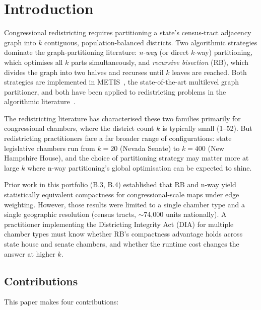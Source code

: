 \section{Introduction}
\label{sec:intro}

Congressional redistricting requires partitioning a state's census-tract
adjacency graph into $k$ contiguous, population-balanced districts.
Two algorithmic strategies dominate the graph-partitioning literature:
\emph{n-way} (or direct $k$-way) partitioning, which optimises all $k$ parts
simultaneously, and \emph{recursive bisection} (RB), which divides the graph
into two halves and recurses until $k$ leaves are reached.
Both strategies are implemented in METIS~\citep{karypis1998}, the
state-of-the-art multilevel graph partitioner, and both have been applied to
redistricting problems in the algorithmic literature~\citep{mehrotra1998optimal,fifield2020automated}.

The redistricting literature has characterised these two families primarily
for congressional chambers, where the district count $k$ is typically small
(1--52).  But redistricting practitioners face a far broader range of
configurations: state legislative chambers run from $k = 20$ (Nevada Senate)
to $k = 400$ (New Hampshire House), and the choice of partitioning strategy
may matter more at large $k$ where n-way partitioning's global optimisation
can be expected to shine.

Prior work in this portfolio (B.3, B.4) established that RB and n-way
yield statistically equivalent compactness for congressional-scale maps
under edge weighting.  However, those results were limited to a single
chamber type and a single geographic resolution (census tracts, $\sim$74{,}000
units nationally).  A practitioner implementing the Districting Integrity
Act (DIA) for multiple chamber types must know whether RB's compactness
advantage holds across state house and senate chambers, and whether the
runtime cost changes the answer at higher $k$.

\subsection*{Contributions}

This paper makes four contributions:

